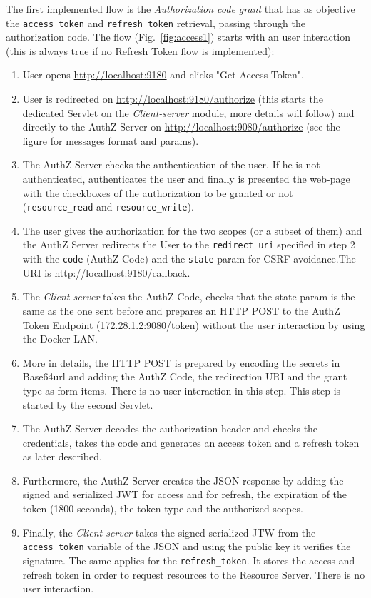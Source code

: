 The first implemented flow is the \textit{Authorization code grant} that has as objective the \texttt{access\_token} and \texttt{refresh\_token} retrieval, passing through the authorization code. The flow (Fig.~\ref{fig:access1}) starts with an user interaction (this is always true if no Refresh Token flow is implemented):

\begin{enumerate}
    \item User opens \url{http://localhost:9180} and clicks "Get Access Token".
    \item User is redirected on \url{http://localhost:9180/authorize} (this starts the dedicated Servlet on the \textit{Client-server} module, more details will follow) and directly to the AuthZ Server on \url{http://localhost:9080/authorize} (see the figure for messages format and params).
    \item The AuthZ Server checks the authentication of the user. If he is not authenticated, authenticates the user and finally is presented the web-page with the checkboxes of the authorization to be granted or not (\texttt{resource\_read} and \texttt{resource\_write}). 
    \item The user gives the authorization for the two scopes (or a subset of them) and the AuthZ Server redirects the User to the \texttt{redirect\_uri} specified in step 2 with the \texttt{code} (AuthZ Code) and the \texttt{state} param for CSRF avoidance.The URI is \url{http://localhost:9180/callback}.
    \item The \textit{Client-server} takes the AuthZ Code, checks that the state param is the same as the one sent before and prepares an HTTP POST to the AuthZ Token Endpoint (\url{172.28.1.2:9080/token}) without the user interaction by using the Docker LAN.
    \item More in details, the HTTP POST is prepared by encoding the secrets in Base64url and adding the AuthZ Code, the redirection URI and the grant type as form items. There is no user interaction in this step. This step is started by the second Servlet.
    \item The AuthZ Server decodes the authorization header and checks the credentials, takes the code and generates an access token and a refresh token as later described.
    \item Furthermore, the AuthZ Server creates the JSON response by adding the signed and serialized JWT for access and for refresh, the expiration of the token (1800 seconds), the token type and the authorized scopes.
    \item Finally, the \textit{Client-server} takes the signed serialized JTW from the \texttt{access\_token} variable of the JSON and using the public key it verifies the signature. The same applies for the \texttt{refresh\_token}. It stores the access and refresh token in order to request resources to the Resource Server. There is no user interaction.
\end{enumerate}



